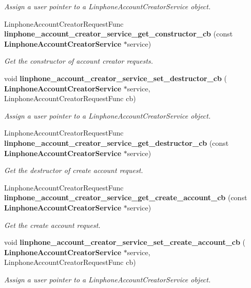 \begin{DoxyCompactItemize}
\begin{DoxyCompactList}\small\item\em Assign a user pointer to a Linphone\+Account\+Creator\+Service object. \end{DoxyCompactList}\item 
Linphone\+Account\+Creator\+Request\+Func \textbf{ linphone\+\_\+account\+\_\+creator\+\_\+service\+\_\+get\+\_\+constructor\+\_\+cb} (const \textbf{ Linphone\+Account\+Creator\+Service} $\ast$service)
\begin{DoxyCompactList}\small\item\em Get the constructor of account creator requests. \end{DoxyCompactList}\item 
void \textbf{ linphone\+\_\+account\+\_\+creator\+\_\+service\+\_\+set\+\_\+destructor\+\_\+cb} (\textbf{ Linphone\+Account\+Creator\+Service} $\ast$service, Linphone\+Account\+Creator\+Request\+Func cb)
\begin{DoxyCompactList}\small\item\em Assign a user pointer to a Linphone\+Account\+Creator\+Service object. \end{DoxyCompactList}\item 
Linphone\+Account\+Creator\+Request\+Func \textbf{ linphone\+\_\+account\+\_\+creator\+\_\+service\+\_\+get\+\_\+destructor\+\_\+cb} (const \textbf{ Linphone\+Account\+Creator\+Service} $\ast$service)
\begin{DoxyCompactList}\small\item\em Get the destructor of create account request. \end{DoxyCompactList}\item 
Linphone\+Account\+Creator\+Request\+Func \textbf{ linphone\+\_\+account\+\_\+creator\+\_\+service\+\_\+get\+\_\+create\+\_\+account\+\_\+cb} (const \textbf{ Linphone\+Account\+Creator\+Service} $\ast$service)
\begin{DoxyCompactList}\small\item\em Get the create account request. \end{DoxyCompactList}\item 
void \textbf{ linphone\+\_\+account\+\_\+creator\+\_\+service\+\_\+set\+\_\+create\+\_\+account\+\_\+cb} (\textbf{ Linphone\+Account\+Creator\+Service} $\ast$service, Linphone\+Account\+Creator\+Request\+Func cb)
\begin{DoxyCompactList}\small\item\em Assign a user pointer to a Linphone\+Account\+Creator\+Service object. \end{DoxyCompactList}\item 

\end{DoxyCompactItemize}
